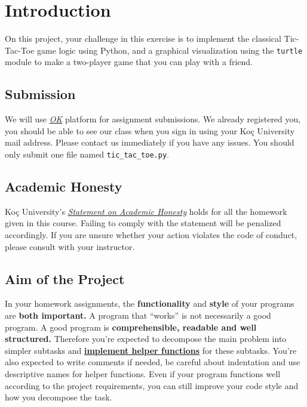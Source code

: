 \documentclass[a4paper]{article}
\author{Hasan Can Aslan}
\title{\projectTitle}
\date{Submission Date: \projectDate}
\newcommand{\projectTitle}{Tic-Tac-Toe}
\newcommand{\assignmentNumber}{1}
\begin{document}
\maketitle

\lstset{language=Python}
\pagestyle{fancy}
\fancyhf{}
\chead{\projectTitle}
\rhead{Assignment \#\assignmentNumber}
\lfoot{\nouppercase{\leftmark}}
\thispagestyle{fancy}
\renewcommand{\headrulewidth}{0.4pt}
\renewcommand{\footrulewidth}{0.4pt}


\section{Introduction}

On this project, your challenge in this exercise is to implement the classical Tic-Tac-Toe game logic using Python, and a graphical visualization using the \texttt{turtle} module to make a two-player game that you can play with a friend.

\subsection{Submission}
We will use \emph{\href{https://okpy.org}{OK}} platform for assignment submissions. We already registered you, you should be able to see our class when you sign in using your Koç University mail address. Please contact us immediately if you have any issues. You should only submit one file named \texttt{tic\_tac\_toe.py}.



\subsection{Academic Honesty}
Koç University's \emph{\href{https://vpaa.ku.edu.tr/sites/vpaa.ku.edu.tr/files/Misc_Documents/Statement_on_Academic_Honesty.pdf}{Statement on Academic Honesty}} holds for all the homework given in this course. Failing to comply with the statement will be penalized accordingly. If you are unsure whether your action violates the code of conduct, please consult with your instructor.

\subsection{Aim of the Project}
In your homework assignments, the \textbf{functionality} and \textbf{style} of your programs are \textbf{both important.}  A program that “works” is not necessarily a good program. A good program is \textbf{comprehensible, readable and well structured.} Therefore you’re expected to decompose the main problem into simpler subtasks and \underline{\textbf{implement helper functions}} for these subtasks. You’re also expected to write comments if needed, be careful about indentation and use descriptive names for helper functions. Even if your program functions well according to the project requirements, you can still improve your code style and how you decompose the task.
\end{document}
